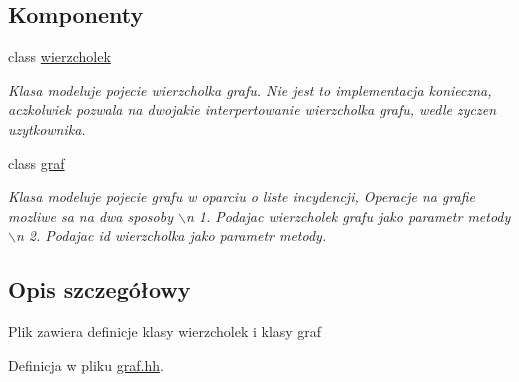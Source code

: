 \subsection*{\-Komponenty}
\begin{DoxyCompactItemize}
\item 
class \hyperlink{classwierzcholek}{wierzcholek}
\begin{DoxyCompactList}\small\item\em \-Klasa modeluje pojecie wierzcholka grafu. \-Nie jest to implementacja konieczna, aczkolwiek pozwala na dwojakie interpertowanie wierzcholka grafu, wedle zyczen uzytkownika. \end{DoxyCompactList}\item 
class \hyperlink{classgraf}{graf}
\begin{DoxyCompactList}\small\item\em \-Klasa modeluje pojecie grafu w oparciu o liste incydencji, \-Operacje na grafie mozliwe sa na dwa sposoby $\backslash$n 1. \-Podajac wierzcholek grafu jako parametr metody $\backslash$n 2. \-Podajac id wierzcholka jako parametr metody. \end{DoxyCompactList}\end{DoxyCompactItemize}


\subsection{\-Opis szczegółowy}
\-Plik zawiera definicje klasy wierzcholek i klasy graf 

\-Definicja w pliku \hyperlink{graf_8hh_source}{graf.\-hh}.


